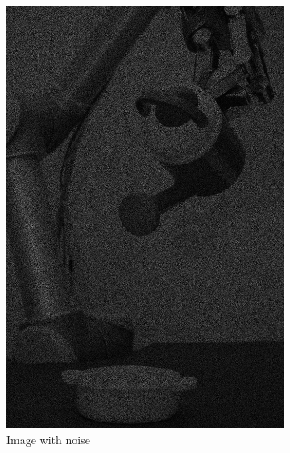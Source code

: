 \begin{figure}[H]
   \begin{subfigure}[b]{0.24\textwidth}
        \includegraphics[width=\textwidth]{img1/Image1.png}
        \caption{Image with noise\\[0.42cm]}
    \end{subfigure}
    \begin{subfigure}[b]{0.24\textwidth}

\end{subfigure}
\end{figure}
